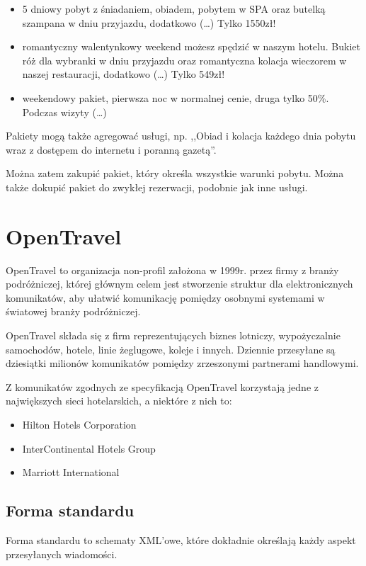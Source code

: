 \documentclass[a4paper,onecolumn,oneside,11pt,wide,floatssmall]{mwrep}
\theoremstyle{definition}
\theoremstyle{plain}%
\theoremstyle{remark}
\begin{document}
\begin{itemize}
 \item 5 dniowy pobyt z śniadaniem, obiadem, pobytem w SPA oraz butelką 
 szampana w dniu przyjazdu, dodatkowo (\dots) Tylko 1550zł!
 \item \label{pakiet-walentynki} romantyczny walentynkowy weekend możesz spędzić w naszym hotelu. 
 Bukiet róż dla wybranki w dniu przyjazdu oraz romantyczna kolacja wieczorem 
 w naszej restauracji, dodatkowo (\dots) Tylko 549zł!
 \item weekendowy pakiet, pierwsza noc w normalnej cenie, druga tylko 50\%. 
 Podczas wizyty (\dots)
\end{itemize}

Pakiety mogą także agregować usługi, np. ,,Obiad i kolacja każdego dnia 
pobytu wraz z dostępem do internetu i poranną gazetą''. 

Można zatem zakupić pakiet, który określa wszystkie warunki pobytu. Można 
także dokupić pakiet do zwykłej rezerwacji, podobnie jak inne usługi.

\section{OpenTravel}
OpenTravel to organizacja non-profil założona w \mbox{1999r.} przez firmy z 
branży podróżniczej, której głównym celem jest stworzenie struktur dla 
elektronicznych komunikatów, aby ułatwić komunikację pomiędzy osobnymi 
systemami w światowej branży podróżniczej.

OpenTravel składa się z firm reprezentujących biznes lotniczy, wypożyczalnie 
samochodów, hotele, linie żeglugowe, koleje i innych. Dziennie przesyłane są 
dziesiątki milionów komunikatów pomiędzy zrzeszonymi partnerami handlowymi.

Z komunikatów zgodnych ze specyfikacją OpenTravel korzystają jedne z największych sieci hotelarskich, a niektóre z nich to:
\begin{itemize}
  \item Hilton Hotels Corporation
  \item InterContinental Hotels Group
  \item Marriott International
\end{itemize}

\subsection{Forma standardu}
Forma standardu to schematy XML'owe, które dokładnie określają każdy aspekt 
przesyłanych wiadomości.
\end{document}
